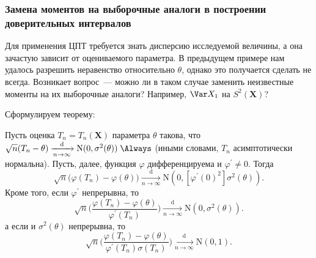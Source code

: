 \subsubsection{Замена моментов на выборочные аналоги в построении доверительных интервалов}

Для применения ЦПТ требуется знать дисперсию исследуемой величины, а она зачастую зависит от оцениваемого параметра.
В предыдущем примере нам удалось разрешить неравенство относительно $\theta$, однако это получается сделать не всегда.
Возникает вопрос~--- можно ли в таком случае заменить неизвестные моменты на их выборочные аналоги? 
Например, $\Var X_1$ на $S^2(\mathbf{X})$?

Сформулируем теорему:
\begin{thm*}
    Пусть оценка $T_n = T_n(\mathbf{X})$ параметра $\theta$ такова, 
    что ${\sqrt{n} (T_n - \theta) \xrightarrow[n \to \infty]{\text{d}} \mathrm{N}(0, \sigma^2(\theta))} \; \Always$
    (иными словами, $T_n$ асимптотически нормальна).
    Пусть, далее, функция $\varphi$ дифференцируема и $\varphi^\prime \neq 0$.
    Тогда 
    \begin{equation*}
        \sqrt{n} \bigl( \varphi(T_n) - \varphi(\theta) \bigr) 
        \xrightarrow[n \to \infty]{\text{d}} 
        \mathrm{N}(0, [\varphi^\prime(0)^2]\sigma^2(\theta)).
    \end{equation*}
    Кроме того, если $\varphi^\prime$ непрерывна, то 
    \begin{equation*}
        \sqrt{n} \bigl( \frac{\varphi(T_n) - \varphi(\theta)}{\varphi^\prime(T_n)} \bigr) 
        \xrightarrow[n \to \infty]{\text{d}} 
        \mathrm{N}(0, \sigma^2(\theta)).
    \end{equation*}
    а если и $\sigma^2(\theta)$ непрерывна, то 
    \begin{equation*}
        \sqrt{n} \bigl( \frac{\varphi(T_n) - \varphi(\theta)}{ \varphi^\prime(T_n) \sigma(T_n) } \bigr) 
        \xrightarrow[n \to \infty]{\text{d}} 
        \mathrm{N}(0, 1).
    \end{equation*}
\end{thm*}

